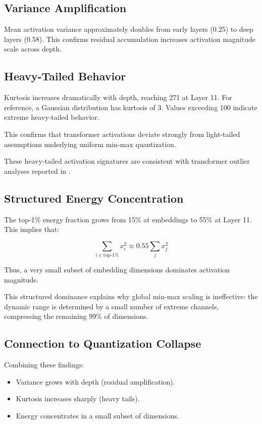 \documentclass[conference]{IEEEtran}
\begin{document}
\subsection{Variance Amplification}

Mean activation variance approximately doubles from early layers (0.25) to deep layers (0.58). This confirms residual accumulation increases activation magnitude scale across depth.

\subsection{Heavy-Tailed Behavior}

Kurtosis increases dramatically with depth, reaching 271 at Layer 11. For reference, a Gaussian distribution has kurtosis of 3. Values exceeding 100 indicate extreme heavy-tailed behavior.

This confirms that transformer activations deviate strongly from light-tailed assumptions underlying uniform min-max quantization.

These heavy-tailed activation signatures are consistent with transformer outlier analyses reported in \cite{bondarenko2021understanding,dettmers2022llmint8}.

\subsection{Structured Energy Concentration}

The top-1\% energy fraction grows from 15\% at embeddings to 55\% at Layer 11. This implies that:

\begin{equation}
\sum_{i \in \text{top-1\%}} x_i^2
\approx 0.55 \sum_{j} x_j^2
\end{equation}

Thus, a very small subset of embedding dimensions dominates activation magnitude.

This structured dominance explains why global min-max scaling is ineffective: the dynamic range is determined by a small number of extreme channels, compressing the remaining 99\% of dimensions.

\subsection{Connection to Quantization Collapse}

Combining these findings:

\begin{itemize}
\item Variance grows with depth (residual amplification).
\item Kurtosis increases sharply (heavy tails).
\item Energy concentrates in a small subset of dimensions.
\end{itemize}
\end{document}
